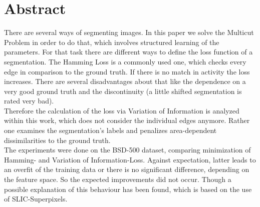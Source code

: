 \begingroup
\let\clearpage\relax
\let\cleardoublepage\relax
\let\cleardoublepage\relax

\chapter*{Abstract}
There are several ways of segmenting images. In this paper we solve the Multicut Problem in order to do that, which involves structured learning of the parameters. For that task there are different ways to define the loss function of a segmentation. The Hamming Loss is a commonly used one, which checks every edge in comparison to the ground truth. If there is no match in activity the loss increases. There are several disadvantages about that like the dependence on a very good ground truth and the discontinuity (a little shifted segmentation is rated very bad). \\
Therefore the calculation of the loss via Variation of Information is analyzed within this work, which does not consider the individual edges anymore. Rather one examines the segmentation's labels and penalizes area-dependent dissimilarities to the ground truth. \\
The experiments were done on the BSD-500 dataset, comparing minimization of Hamming- and Variation of Information-Loss. Against expectation, latter leads to an overfit of the training data or there is no significant difference, depending on the feature space. So the expected improvements did not occur. Though a possible explanation of this behaviour has been found, which is based on the use of SLIC-Superpixels.

\newpage
\vfill

